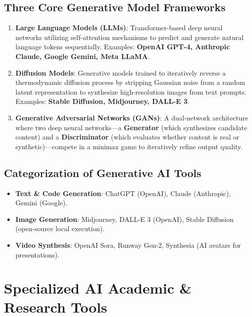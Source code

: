 \subsection{Three Core Generative Model Frameworks}
\begin{enumerate}[leftmargin=1.5em]
    \item \textbf{Large Language Models (LLMs)}:
    Transformer-based deep neural networks utilizing self-attention mechanisms to predict and generate natural language tokens sequentially. Examples: \textbf{OpenAI GPT-4, Anthropic Claude, Google Gemini, Meta LLaMA}.
    \item \textbf{Diffusion Models}:
    Generative models trained to iteratively reverse a thermodynamic diffusion process by stripping Gaussian noise from a random latent representation to synthesize high-resolution images from text prompts. Examples: \textbf{Stable Diffusion, Midjourney, DALL-E 3}.
    \item \textbf{Generative Adversarial Networks (GANs)}:
    A dual-network architecture where two deep neural networks—a \textbf{Generator} (which synthesizes candidate content) and a \textbf{Discriminator} (which evaluates whether content is real or synthetic)—compete in a minimax game to iteratively refine output quality.
\end{enumerate}

\subsection{Categorization of Generative AI Tools}
\begin{itemize}[leftmargin=1.5em]
    \item \textbf{Text \& Code Generation}: ChatGPT (OpenAI), Claude (Anthropic), Gemini (Google).
    \item \textbf{Image Generation}: Midjourney, DALL-E 3 (OpenAI), Stable Diffusion (open-source local execution).
    \item \textbf{Video Synthesis}: OpenAI Sora, Runway Gen-2, Synthesia (AI avatars for presentations).
\end{itemize}

\section{Specialized AI Academic \& Research Tools}

